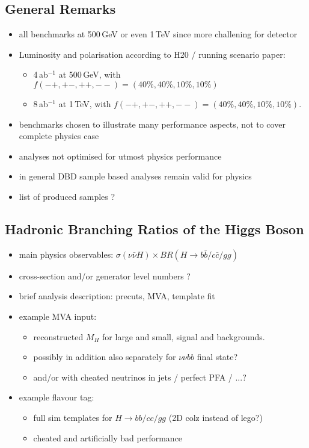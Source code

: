 
\subsection{General Remarks}
\begin{itemize}
\item all benchmarks at 500\,GeV or even 1\,TeV since more challening for detector
\item Luminosity and polarisation according to H20 / running scenario paper: 
  \begin{itemize}
   \item 4\,ab$^{-1}$ at 500\,GeV, with $f(-+,+-,++,--) = (40\%,40\%, 10\%, 10\%)$
   \item 8\,ab$^{-1}$ at 1\,TeV, with $f(-+,+-,++,--) = (40\%,40\%, 10\%, 10\%)$.
\end{itemize}
\item benchmarks chosen to illustrate many performance aspects, not to cover complete physics case
\item analyses not optimised for utmost physics performance
\item in general DBD sample based analyses remain valid for physics
\item list of produced samples ?
\end{itemize}

\subsection{Hadronic Branching Ratios of the Higgs Boson}
\begin{itemize}
\item main physics observables: $\sigma(\nu\bar{\nu} H)\times BR(H\to b\bar{b} / c\bar{c} / gg)$
\item cross-section and/or generator level numbers ? 
\item brief analysis description: precuts, MVA, template fit
\item example MVA input: 
  \begin{itemize}
     \item reconstructed $M_H$ for large and small, signal and backgrounds. 
     \item possibly in addition also separately for $\nu\nu bb$ final state?
     \item and/or with cheated neutrinos in jets / perfect PFA / ...?
  \end{itemize}
\item example flavour tag: 
  \begin{itemize}
     \item full sim templates for $H \to bb / cc / gg$ (2D colz instead of lego?)
     \item cheated and artificially bad performance
  \end{itemize}
\end{itemize}

